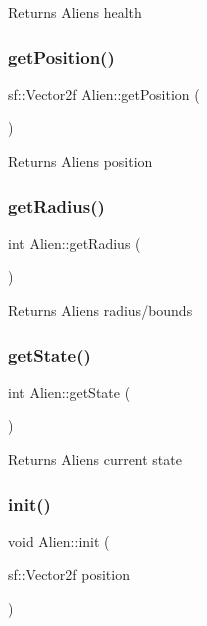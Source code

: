 Returns Aliens health \mbox{\label{class_alien_a52dc07105cf8ff2a25961ecebf9fbbe1}} 
\subsubsection{\texorpdfstring{get\+Position()}{getPosition()}}
{\footnotesize\ttfamily sf\+::\+Vector2f Alien\+::get\+Position (\begin{DoxyParamCaption}{ }\end{DoxyParamCaption})}

Returns Aliens position \mbox{\label{class_alien_ab649dc3a1c86463c29b32931683685ab}} 
\subsubsection{\texorpdfstring{get\+Radius()}{getRadius()}}
{\footnotesize\ttfamily int Alien\+::get\+Radius (\begin{DoxyParamCaption}{ }\end{DoxyParamCaption})}

Returns Aliens radius/bounds \mbox{\label{class_alien_a4954611d3a021f57a02564f17a3b0efc}} 
\subsubsection{\texorpdfstring{get\+State()}{getState()}}
{\footnotesize\ttfamily int Alien\+::get\+State (\begin{DoxyParamCaption}{ }\end{DoxyParamCaption})}

Returns Aliens current state \mbox{\label{class_alien_a516b6245841735741f287b38c20b8853}} 
\subsubsection{\texorpdfstring{init()}{init()}}
{\footnotesize\ttfamily void Alien\+::init (\begin{DoxyParamCaption}\item[{sf\+::\+Vector2f}]{position }\end{DoxyParamCaption})}

